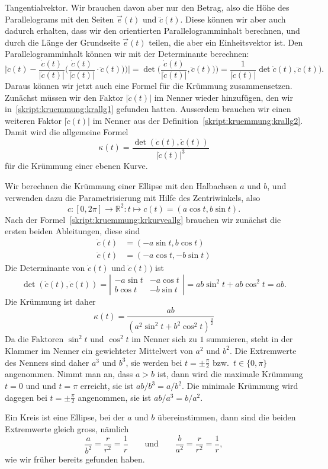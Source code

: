 Tangentialvektor.
Wir brauchen davon aber nur den Betrag, also die Höhe des Parallelograms
mit den Seiten $\vec e(t)$ und $\ddot c(t)$.
Diese können wir aber auch dadurch erhalten, dass wir den orientierten
Parallelogramminhalt berechnen, und durch die Länge der Grundseite
$\vec e(t)$ teilen, die aber ein Einheitsvektor ist.
Den Parallelogramminhalt können wir mit der Determinante berechnen:
\[
\biggl|\ddot c(t) - \frac{\dot c(t)}{|\dot c(t)|}
\biggl(\frac{\dot c(t)}{|\dot c(t)|} \cdot \ddot c(t))\biggr)\biggr|
=
\det \biggl(\frac{\dot c(t)}{|\dot c(t)|}, \ddot c(t))\biggr)
=
\frac1{|\dot c(t)|}\det \dot c(t),\ddot c(t)).
\]
Daraus können wir jetzt auch eine Formel für die Krümmung zusammensetzen.
Zunächst müssen wir den Faktor $|\dot c(t)|$ im Nenner wieder
hinzufügen, den wir in~\eqref{skript:kruemmung:krallg1} gefunden hatten.
Ausserdem brauchen wir einen weiteren Faktor $|\dot c(t)|$ im Nenner
aus der Definition~\eqref{skript:kruemmung:krallg2}.
Damit wird die allgemeine Formel
\begin{equation}
\kappa(t)
=
\frac{\det(\dot c(t),\ddot c(t))}{|\dot c(t)|^3}
\label{skript:kruemmung:krkurveallg}
\end{equation}
für die Krümmung einer ebenen Kurve.


\begin{beispiel}
Wir berechnen die Krümmung einer Ellipse mit den Halbachsen
$a$ und $b$, und verwenden dazu die Parametrisierung mit Hilfe des
Zentriwinkels, also
\[
c
\colon
[0,2\pi]\to\mathbb R^2
\colon
t\mapsto c(t) = (a\cos t, b \sin t).
\]
Nach der Formel~\eqref{skript:kruemmung:krkurveallg} brauchen wir zunächst
die ersten beiden Ableitungen, diese sind
\begin{align*}
\dot c(t)
&=
(-a\sin t, b\cos t)
\\
\ddot c(t)
&=
(-a\cos t, -b\sin t)
\end{align*}
Die Determinante von $\dot c(t)$ und $\ddot c(t))$ ist
\[
\det(\dot c(t), \ddot c(t))
=
\left|\begin{matrix}
-a\sin t & -a \cos t\\
 b\cos t & -b \sin t
\end{matrix}\right|
=
ab\sin^2t+ab\cos^2 t
=
ab.
\]
Die Krümmung ist daher
\[
\kappa(t)
=
\frac{ab}{(a^2\sin^2 t + b^2 \cos^2 t)^{\frac32}}
\]
Da die Faktoren $\sin^2t$ und $\cos^2t$ im Nenner sich zu $1$ summieren,
steht in der Klammer im Nenner ein gewichteter Mittelwert von $a^2$
und $b^2$.
Die Extremwerte des Nenners sind daher $a^3$ und $b^3$, sie werden bei
$t=\pm\frac{\pi}2$ bzw.~$t\in\{0,\pi\}$ angenommen.
Nimmt man an, dass $a>b$ ist, dann wird die maximale Krümmung $t=0$ und
und $t=\pi$ erreicht, sie ist $ab/b^3=a/b^2$.
Die minimale Krümmung wird dagegen bei $t=\pm\frac{\pi}2$ angenommen,
sie ist $ab/a^3=b/a^2$.

Ein Kreis ist eine Ellipse, bei der $a$ und $b$ übereinstimmen, dann sind
die beiden Extremwerte gleich gross, nämlich
\[
\frac{a}{b^2}=\frac{r}{r^2}=\frac1r
\qquad\text{und}\qquad
\frac{b}{a^2}=\frac{r}{r^2}=\frac1r,
\]
wie wir früher bereits gefunden haben.
\end{beispiel}

